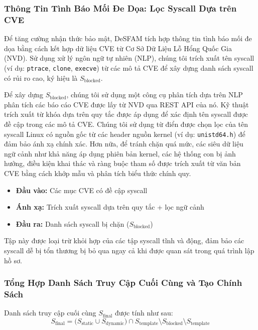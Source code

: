 \subsubsection{Thông Tin Tình Báo Mối Đe Dọa: Lọc Syscall Dựa trên CVE}
\label{subsubsec:cve_filtering}

Để tăng cường nhận thức bảo mật, DeSFAM tích hợp thông tin tình báo mối đe dọa bằng cách kết
hợp dữ liệu CVE từ Cơ Sở Dữ Liệu Lỗ Hổng Quốc Gia (NVD). Sử dụng xử lý ngôn ngữ tự nhiên
(NLP), chúng tôi trích xuất tên syscall (ví dụ: \texttt{ptrace}, \texttt{clone},
\texttt{execve}) từ các mô tả CVE để xây dựng danh sách syscall có rủi ro cao, ký hiệu là
$S_{\text{blocked}}$.

Để xây dựng $S_{\text{blocked}}$, chúng tôi sử dụng một công cụ phân tích dựa trên NLP phân
tích các báo cáo CVE được lấy từ NVD qua REST API của nó. Kỹ thuật trích xuất từ khóa dựa trên
quy tắc được áp dụng để xác định tên syscall được đề cập trong các mô tả CVE. Chúng tôi sử dụng
từ điển được chọn lọc của tên syscall Linux có nguồn gốc từ các header nguồn kernel (ví dụ:
\texttt{unistd64.h}) để đảm bảo ánh xạ chính xác. Hơn nữa, để tránh chặn quá mức, các siêu dữ
liệu ngữ cảnh như khả năng áp dụng phiên bản kernel, các hệ thống con bị ảnh hưởng, điều kiện
khai thác và ràng buộc tham số được trích xuất từ văn bản CVE bằng cách khớp mẫu và phân tích
biểu thức chính quy.

\begin{itemize}
  \item \textbf{Đầu vào:} Các mục CVE có đề cập syscall
  \item \textbf{Ánh xạ:} Trích xuất syscall dựa trên quy tắc + lọc ngữ cảnh
  \item \textbf{Đầu ra:} Danh sách syscall bị chặn ($S_{\text{blocked}}$)
\end{itemize}

Tập này được loại trừ khỏi hợp của các tập syscall tĩnh và động, đảm bảo các syscall dễ bị tổn
thương bị bỏ qua ngay cả khi được quan sát trong quá trình lập hồ sơ.

\subsubsection{Tổng Hợp Danh Sách Truy Cập Cuối Cùng và Tạo Chính Sách}
\label{subsubsec:synthesis}

Danh sách truy cập cuối cùng $S_{\text{final}}$ được tính như sau:
\begin{equation}
  S_{\text{final}} = \bigl(S_{\text{static}} \cup S_{\text{dynamic}}\bigr)
                      \cap S_{\text{template}}
                      \setminus S_{\text{blocked}}
                      \setminus S_{\text{template}}
  \label{eq:sfinal}
\end{equation}

